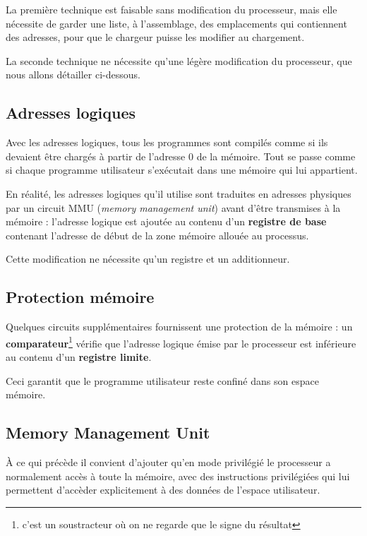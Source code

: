 \begin{multicols}{2}
La première technique est faisable sans modification du processeur,
mais elle nécessite de garder une liste, à l'assemblage,
des emplacements qui contiennent des adresses, pour que le chargeur
puisse les modifier au chargement.

La seconde technique ne nécessite qu'une légère
modification du processeur, que nous allons détailler ci-dessous.


\subsection{Adresses logiques}

Avec les adresses logiques, tous les programmes sont compilés comme si
ils devaient être chargés à partir de l'adresse 0 de la mémoire.  Tout
se passe comme si chaque programme utilisateur s'exécutait dans une
mémoire qui lui appartient.


En réalité, les adresses logiques qu'il utilise sont traduites en
adresses physiques par un circuit MMU (\emph{memory management unit}) 
avant
d'être transmises à la mémoire : 
l'adresse logique est ajoutée au contenu d'un \textbf{registre de
base} contenant l'adresse de début de la zone mémoire allouée au
processus.

Cette modification ne  nécessite qu'un registre
et un additionneur.   


\subsection{Protection mémoire}

Quelques circuits supplémentaires fournissent une protection de
la mémoire : un \textbf{comparateur}\footnote{c'est un soustracteur où
  on ne regarde que le signe du résultat} vérifie que l'adresse
logique émise par le processeur est inférieure au contenu d'un
\textbf{registre limite}.


Ceci garantit que le programme utilisateur reste confiné dans son
espace mémoire.

\subsection{Memory Management Unit}

À ce qui précède il convient d'ajouter qu'en mode privilégié le
processeur a normalement accès à toute la mémoire, avec des
instructions privilégiées qui lui permettent d'accèder explicitement
à des données  de l'espace utilisateur.


\end{multicols}
